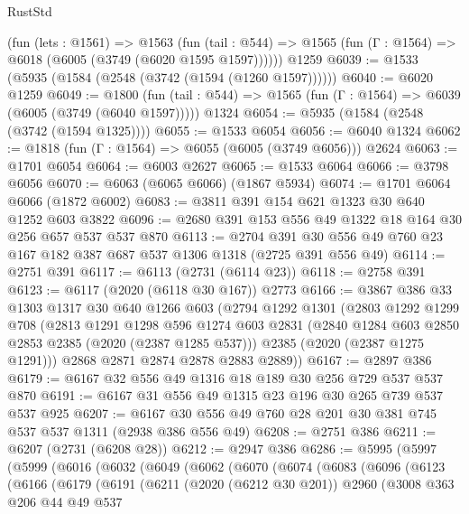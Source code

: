 \begin{lexlean}{RustStd}
\begin{coremodule}
    (fun (lets : @1561) =>
    @1563
      (fun (tail : @544) => @1565 (fun (Γ : @1564) => @6018 (@6005 (@3749 (@6020 @1595 @1597))))))
    @1259
@6039 := @1533 (@5935 (@1584 (@2548 (@3742 (@1594 (@1260 @1597))))))
@6040 := @6020 @1259
@6049 := @1800
    (fun (tail : @544) => @1565 (fun (Γ : @1564) => @6039 (@6005 (@3749 (@6040 @1597)))))
    @1324
@6054 := @5935 (@1584 (@2548 (@3742 (@1594 @1325))))
@6055 := @1533 @6054
@6056 := @6040 @1324
@6062 := @1818 (fun (Γ : @1564) => @6055 (@6005 (@3749 @6056))) @2624
@6063 := @1701 @6054
@6064 := @6003 @2627
@6065 := @1533 @6064
@6066 := @3798 @6056
@6070 := @6063 (@6065 @6066) (@1867 @5934)
@6074 := @1701 @6064 @6066 (@1872 @6002)
@6083 := @3811 @391 @154 @621 @1323 @30 @640 @1252 @603 @3822
@6096 := @2680 @391 @153 @556 @49 @1322 @18 @164 @30 @256 @657 @537 @537 @870
@6113 := @2704 @391 @30 @556 @49 @760 @23 @167 @182 @387 @687 @537 @1306 @1318 (@2725 @391 @556 @49)
@6114 := @2751 @391
@6117 := @6113 (@2731 (@6114 @23))
@6118 := @2758 @391
@6123 := @6117 (@2020 (@6118 @30 @167)) @2773
@6166 := @3867
    @386
    @33
    @1303
    @1317
    @30
    @640
    @1266
    @603
    (@2794
      @1292
      @1301
      (@2803
        @1292
        @1299
        @708
        (@2813
          @1291
          @1298
          @596
          @1274
          @603
          @2831
          (@2840 @1284 @603 @2850 @2853 @2385 (@2020 (@2387 @1285 @537)))
          @2385
          (@2020 (@2387 @1275 @1291)))
        @2868
        @2871
        @2874
        @2878
        @2883
        @2889))
@6167 := @2897 @386
@6179 := @6167 @32 @556 @49 @1316 @18 @189 @30 @256 @729 @537 @537 @870
@6191 := @6167 @31 @556 @49 @1315 @23 @196 @30 @265 @739 @537 @537 @925
@6207 := @6167 @30 @556 @49 @760 @28 @201 @30 @381 @745 @537 @537 @1311 (@2938 @386 @556 @49)
@6208 := @2751 @386
@6211 := @6207 (@2731 (@6208 @28))
@6212 := @2947 @386
@6286 := @5995
    (@5997
      (@5999
        (@6016
          (@6032
            (@6049
              (@6062
                (@6070
                  (@6074
                    (@6083
                      (@6096
                        (@6123
                          (@6166
                            (@6179
                              (@6191
                                (@6211
                                  (@2020 (@6212 @30 @201))
                                  @2960
                                  (@3008
                                    @363
                                    @206
                                    @44
                                    @49
                                    @537

\end{coremodule}
\end{lexlean}
